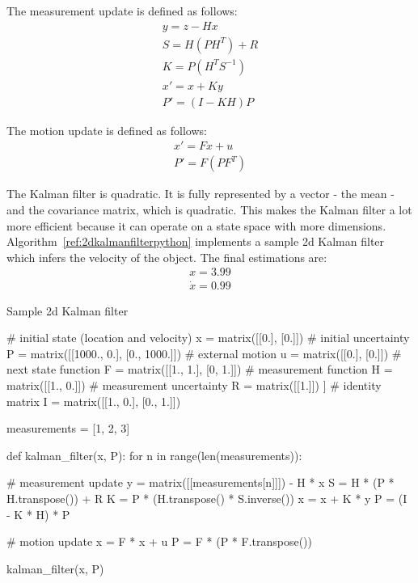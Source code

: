 \documentclass{report}
\begin{document}
The measurement update is defined as follows:
\begin{align*}
y = z - Hx \\
S = H(PH^T) + R \\
K = P(H^T S^{-1}) \\
x\prime = x + Ky \\
P\prime = (I - KH)P
\end{align*}


The motion update is defined as follows:
\begin{align*}
x\prime = Fx + u \\
P\prime = F(PF^T)
\end{align*}

The Kalman filter is quadratic. It is fully represented by a vector - the mean - and the covariance matrix, which is quadratic. This makes the Kalman filter a lot more efficient because it can operate on a state space with more dimensions. \\

Algorithm~\ref{ref:2dkalmanfilterpython} implements a sample 2d Kalman filter which infers the velocity of the object. The final estimations are:
\begin{align*}
x = 3.99 \\
\dot{x} = 0.99
\end{align*}

\begin{algorithm}
\caption{Sample 2d Kalman filter}
\label{ref:2dkalmanfilterpython}
\begin{python}
# initial state (location and velocity)
x = matrix([[0.], [0.]])
# initial uncertainty
P = matrix([[1000., 0.], [0., 1000.]])
# external motion
u = matrix([[0.], [0.]])
# next state function
F = matrix([[1., 1.], [0, 1.]])
# measurement function
H = matrix([[1., 0.]])
# measurement uncertainty
R = matrix([[1.]]) ]
# identity matrix
I = matrix([[1., 0.], [0., 1.]])

measurements = [1, 2, 3]

def kalman_filter(x, P):
    for n in range(len(measurements)):

        # measurement update
        y = matrix([[measurements[n]]]) - H * x
        S = H * (P * H.transpose()) + R
        K = P * (H.transpose() * S.inverse())
        x = x + K * y
        P = (I - K * H) * P

        # motion update
        x = F * x + u
        P = F * (P * F.transpose())

kalman_filter(x, P)
\end{python}
\end{algorithm}
\end{document}

